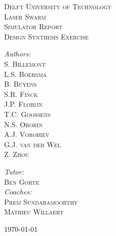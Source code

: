 \begin{titlepage}
\begin{center}

\textsc{\LARGE Delft University of Technology}\\[1.5cm]

\textsc{\Huge Laser Swarm}\\[0.5cm]
\textsc{\small Simulator Report}\\[1.5cm]
\textsc{\large Design Synthesis Exercise}\\[2.5cm]

\begin{minipage}{0.4\textwidth}
\begin{flushleft} \large
\emph{Authors:}\\
\textsc{S. Billemont\\
L.S. Boersma\\
B. Buyens\\
S.R. Finck\\
J.P. Florijn\\
T.C. Goossens\\
N.S. Oborin\\
A.J. Vorobiev\\
G.J. van der Wel\\
Z. Zhou\\}
\end{flushleft}
\end{minipage}
\begin{minipage}{0.4\textwidth}
\begin{flushright}
\emph{Tutor:}\\
\textsc{Ben Gorte}\\[1cm]
\emph{Coaches:}\\
\textsc{Prem Sundaramoorthy\\
Mathieu Willaert}
\end{flushright}
\end{minipage}
\vfill

\today
\end{center}
\end{titlepage}